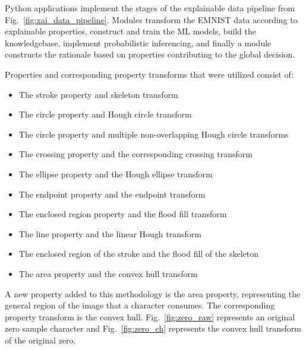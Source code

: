 \documentclass[conference]{IEEEtran}
\begin{document}
Python applications implement the stages of the explainable data pipeline from
Fig.~\ref{fig:xai_data_pipeline}. Modules transform the EMNIST data according to
explainable properties, construct and train the ML models, build the
knowledgebase, implement probabilistic inferencing, and finally a module
constructs the rationale based on properties contributing to the global
decision.

Properties and corresponding property transforms that were utilized consist of:
\begin{itemize}
    \item The stroke property and skeleton transform
    \item The circle property and Hough circle transform
    \item The circle property and multiple non-overlapping Hough circle transforms
    \item The crossing property and the corresponding crossing transform
    \item The ellipse property and the Hough ellipse transform
    \item The endpoint property and the endpoint transform
    \item The enclosed region property and the flood fill transform
    \item The line property and the linear Hough transform
    \item The enclosed region of the stroke and the flood fill of the skeleton
    \item The area property and the convex hull transform
\end{itemize}

A new property added to this methodology is the area property, representing the
general region of the image that a character consumes. The corresponding
property transform is the convex hull. Fig.~\ref{fig:zero_raw} represents an
original zero sample character and Fig.~\ref{fig:zero_ch} represents the convex
hull transform of the original zero.
\end{document}
